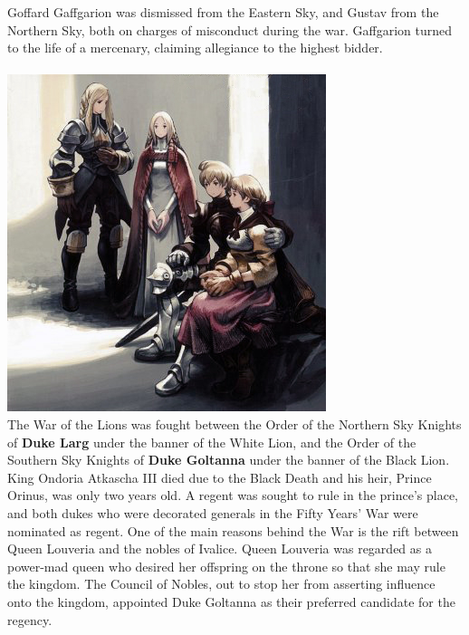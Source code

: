 Goffard Gaffgarion was dismissed from the Eastern Sky, and Gustav from the Northern Sky, both on charges of misconduct during the war. 
Gaffgarion turned to the life of a mercenary, claiming allegiance to the highest bidder.
%
\\\\
\includegraphics[width=\columnwidth]{./art/images/belouve.jpg}
%
\\
The War of the Lions was fought between the Order of the Northern Sky Knights of \textbf{Duke Larg} under the banner of the White Lion, and the Order of the Southern Sky Knights of \textbf{Duke Goltanna} under the banner of the Black Lion. 
King Ondoria Atkascha III died due to the Black Death and his heir, Prince Orinus, was only two years old. 
A regent was sought to rule in the prince's place, and both dukes who were decorated generals in the Fifty Years' War were nominated as regent.
One of the main reasons behind the War is the rift between Queen Louveria and the nobles of Ivalice. 
Queen Louveria was regarded as a power-mad queen who desired her offspring on the throne so that she may rule the kingdom. 
The Council of Nobles, out to stop her from asserting influence onto the kingdom, appointed Duke Goltanna as their preferred candidate for the regency.
